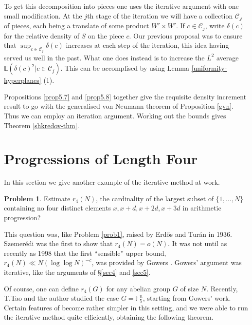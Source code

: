 \documentclass[12pt,a4paper,reqno]{amsart}
\numberwithin{equation}{section}
\theoremstyle{plain}
\theoremstyle{definition}
\newtheorem{problem}[subsection]{Problem}
\begin{document}
\noindent To get this decomposition into pieces one uses the iterative argument with one small modification. At the $j$th stage of the iteration we will have a collection $\mathcal{C_j}$ of pieces, each being a translate of some product $W' \times W'$. If $c \in \mathcal{C}_j$, write $\delta(c)$ for the relative density of $S$ on the piece $c$. Our previous proposal was to ensure that $\sup_{c \in \mathcal{C}_j} \delta(c)$ increases at each step of the iteration, this idea having served us well in the past.
What one does instead is to increase the $L^2$ average $\mathbb{E}(\delta(c)^2 | c \in \mathcal{C}_j)$. This can be accomplised by using Lemma \ref{uniformity-hyperplanes} (1).\vspace{11pt}

\noindent Propositions \ref{prop5.7} and \ref{prop5.8} together give the requisite density increment result to go with the generalised von Neumann theorem of Proposition \ref{gvn}. Thus we can employ an iteration argument. Working out the bounds gives Theorem \ref{shkredov-thm}.


\section{Progressions of Length Four}\label{sec6}

\noindent In this section we give another example of the iterative method at work.

\begin{problem} Estimate $r_4(N)$, the cardinality of the largest subset of $\{1,\dots,N\}$ containing no four distinct elements $x,x+d,x+2d,x+3d$ in arithmetic progression?
\end{problem}
\noindent This question was, like Problem \ref{prob1}, raised by Erd\H{o}s and Tur\'an in 1936. Szemer\'edi \cite{szemeredi-4} was the first to show that $r_4(N) = o(N)$. It was not until as recently as 1998 that the first ``sensible'' upper bound, $r_4(N) \ll N(\log \log N)^{-c}$, was provided by Gowers \cite{gowers-szem4}. Gowers' argument was iterative, like the arguments of \S \ref{sec4} and \ref{sec5}. \vspace{11pt}

\noindent Of course, one can define $r_4(G)$ for any abelian group $G$ of size $N$. Recently, T.Tao and the author \cite{green-tao-ap4s} studied the case $G = \mathbb{F}_5^n$, starting from Gowers' work. Certain features of \cite{gowers-szem4} become rather simpler in this setting, and we were able to run the iterative method quite efficiently, obtaining the following theorem.
\end{document}

